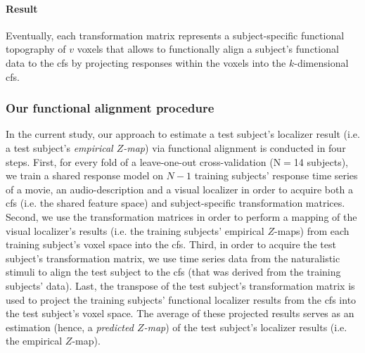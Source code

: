 

\paragraph{Result}
Eventually, each transformation matrix represents a subject-specific functional
topography of {$v$} voxels that allows to functionally align a subject's
functional data to the \ac{cfs} by projecting responses within the voxels into
the $k$-dimensional \ac{cfs}.



\subsubsection{Our functional alignment procedure}

%
In the current study, our approach to estimate a test subject's localizer result
(i.e. a test subject's \textit{empirical $Z$-map}) via functional alignment is
conducted in four steps.
First, for every fold of a leave-one-out cross-validation (N$=$14 subjects), we
train a shared response model on $N-1$ training subjects' response time series
of a movie, an audio-description and a visual localizer in order to acquire both
a \ac{cfs} (i.e.  the shared feature space) and subject-specific transformation
matrices.
Second, we use the transformation matrices in order to perform a mapping of the
visual localizer's results (i.e. the training subjects' empirical $Z$-maps) from
each training subject's voxel space into the \ac{cfs}.
Third, in order to acquire the test subject's transformation matrix, we use time
series data from the naturalistic stimuli to align the test subject to the
\ac{cfs} (that was derived from the training subjects' data).
Last, the transpose of the test subject's transformation matrix is used to
project the training subjects' functional localizer results from the \ac{cfs}
into the test subject's voxel space.
The average of these projected results serves as an estimation (hence, a
\textit{predicted $Z$-map}) of the test subject's localizer results (i.e. the
empirical $Z$-map).


